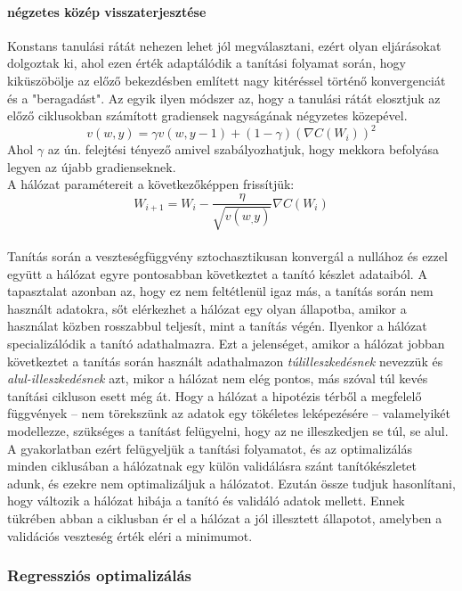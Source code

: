 \paragraph[RMSprop]{négzetes közép visszaterjesztése}
Konstans tanulási rátát nehezen lehet jól megválasztani, ezért olyan eljárásokat dolgoztak ki, ahol ezen érték adaptálódik a tanítási folyamat során, hogy kiküszöbölje az előző bekezdésben említett nagy kitéréssel történő konvergenciát és a "beragadást". Az egyik ilyen módszer az, hogy a tanulási rátát elosztjuk az előző ciklusokban számított gradiensek nagyságának négyzetes közepével.
$$ v(w,y) = \gamma v(w,y-1) +(1-\gamma)(\nabla C(W_i))^2 $$
Ahol $\gamma$ az ún. felejtési tényező amivel szabályozhatjuk, hogy mekkora befolyása legyen az újabb gradienseknek.\\
A hálózat paramétereit a következőképpen frissítjük:
$$ W_{i+1} = W_i - \frac{\eta}{\sqrt{v(w_,y)}} \nabla C(W_i) $$
\\
Tanítás során a veszteségfüggvény sztochasztikusan konvergál a nullához és ezzel együtt a hálózat egyre pontosabban következtet a tanító készlet adataiból. A tapasztalat azonban az, hogy ez nem feltétlenül igaz más, a tanítás során nem használt adatokra, sőt elérkezhet a hálózat egy olyan állapotba, amikor a használat közben rosszabbul teljesít, mint a tanítás végén. Ilyenkor a hálózat specializálódik a tanító adathalmazra. Ezt a jelenséget, amikor a hálózat jobban következtet a tanítás során használt adathalmazon \emph{túlilleszkedésnek} nevezzük és \emph{alul-illeszkedésnek} azt, mikor a hálózat nem elég pontos, más szóval túl kevés tanítási cikluson esett még át. Hogy a hálózat a hipotézis térből a megfelelő függvények -- nem törekszünk az adatok egy tökéletes leképezésére -- valamelyikét modellezze, szükséges a tanítást felügyelni, hogy az ne illeszkedjen se túl, se alul.
A gyakorlatban ezért felügyeljük a tanítási folyamatot, és az optimalizálás minden ciklusában a hálózatnak egy külön validálásra szánt tanítókészletet adunk, és ezekre nem optimalizáljuk a hálózatot. Ezután össze tudjuk hasonlítani, hogy változik a hálózat hibája a tanító és validáló adatok mellett. Ennek tükrében abban a ciklusban ér el a hálózat a jól illesztett állapotot, amelyben a validációs veszteség érték eléri a minimumot.

\subsubsection{Regressziós optimalizálás}
